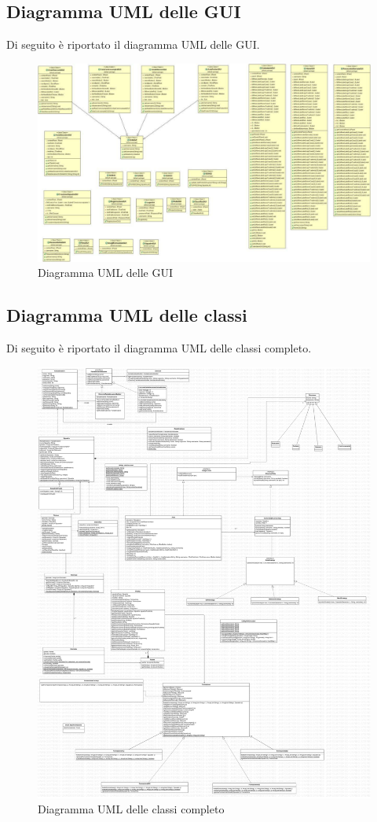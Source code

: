 \documentclass[12pt,a4paper]{article}
\begin{document}
\subsection{Diagramma UML delle GUI}
Di seguito è riportato il diagramma UML delle GUI.\\
\begin{figure}[h]
\centering
\includegraphics[width=14 cm,keepaspectratio]{UMLGui.png}
\caption{Diagramma UML delle GUI}
\end{figure}
\newpage
\subsection{Diagramma UML delle classi}
Di seguito è riportato il diagramma UML delle classi completo.\\
\begin{figure}[h]
\centering
\includegraphics[width=14 cm,keepaspectratio]{UML.jpg}
\caption{Diagramma UML delle classi completo}
\end{figure}
\newpage
\end{document}

